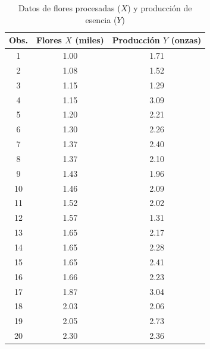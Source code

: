 \documentclass[10pt]{article}
\begin{document}
\begin{table}[H]
    \centering
    \caption{Datos de flores procesadas ($X$) y producción de esencia ($Y$)}
    \label{tab:flowers}
    \begin{tabular}{|c|c|c|}
        \hline
        \textbf{Obs.} & \textbf{Flores $X$ (miles)} & \textbf{Producción $Y$ (onzas)} \\
        \hline
        1  & 1.00 & 1.71 \\
        2  & 1.08 & 1.52 \\
        3  & 1.15 & 1.29 \\
        4  & 1.15 & 3.09 \\
        5  & 1.20 & 2.21 \\
        6  & 1.30 & 2.26 \\
        7  & 1.37 & 2.40 \\
        8  & 1.37 & 2.10 \\
        9  & 1.43 & 1.96 \\
        10 & 1.46 & 2.09 \\
        11 & 1.52 & 2.02 \\
        12 & 1.57 & 1.31 \\
        13 & 1.65 & 2.17 \\
        14 & 1.65 & 2.28 \\
        15 & 1.65 & 2.41 \\
        16 & 1.66 & 2.23 \\
        17 & 1.87 & 3.04 \\
        18 & 2.03 & 2.06 \\
        19 & 2.05 & 2.73 \\
        20 & 2.30 & 2.36 \\
        \hline
    \end{tabular}
\end{table}
\end{document}
